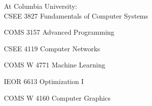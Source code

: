 \documentclass[10pt,a4paper]{article}
\begin{document}
  \vspace{1.0em}
  
    \headedsubsection
   {At Columbia University: \\}{}{}
   \inlineheadsection  %
  {CSEE 3827 Fundamentals of Computer Systems}
  {}
  \vspace{0.5em}  
  
  \inlineheadsection  %
  {COMS 3157 Advanced Programming}
  {}
  \vspace{0.5em}  
  
   \inlineheadsection  %
  {CSEE 4119 Computer Networks}
  {}
  \vspace{0.5em}  
  
   \inlineheadsection  %
  {COMS W 4771 Machine Learning}
  {}
  \vspace{0.5em}  
  
   \inlineheadsection  %
  {IEOR 6613 Optimization I}
  {}
  \vspace{0.5em}  
  
   \inlineheadsection  %
  {COMS W 4160 Computer Graphics}
  {}
  \vspace{0.5em}  
  
  \iffalse
   \roottitle{Related Online Course list} 
   \inlineheadsection
  {\href{https://www.coursera.org/learn/machine-learning}Coursera Machine Learning}
  {Online Courseware and Andrew Ng's notes}
  \vspace{0.5em}
  
   \inlineheadsection
  {\href{https://www.udacity.com/course/intro-to-machine-learning--ud120}Udacity Machine Learning}
  {Online Courseware}
  \vspace{0.5em}
  
     \inlineheadsection
  {\href{http://www0.cs.ucl.ac.uk/staff/d.silver/web/Teaching.html}Reinforcement Learning by David Silver}
  {}
  \vspace{0.5em}

  
       \inlineheadsection
  {\href{http://www0.cs.ucl.ac.uk/staff/d.silver/web/Teaching.html}Stanford CS231n Convolutional Neural Networks for Visual Recognition by Fei-Fei Li, Andrej Karpathy and Justin Johnson}
  {}
  \vspace{0.5em}
  \fi
  
\end{document}
